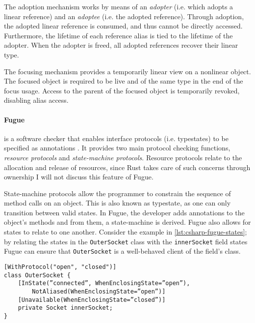 The adoption mechanism works by means of an \emph{adopter} (i.e. which adopts a linear reference) and an \emph{adoptee} (i.e. the adopted reference).
Through adoption, the adopted linear reference is consumed, and thus cannot be directly accessed.
Furthermore, the lifetime of each reference alias is tied to the lifetime of the adopter.
When the adopter is freed, all adopted references recover their linear type.

The focusing mechanism provides a temporarily linear view on a nonlinear object.
The focused object is required to be live and of the same type in the end of the focus usage.
Access to the parent of the focused object is temporarily revoked, disabling alias access.

\paragraph{Fugue} is a software checker that enables interface protocols (i.e. typestates) to be specified as annotations \autocite{DeLine2004}.
It provides two main protocol checking functions, \emph{resource protocols} and \emph{state-machine protocols}.
Resource protocols relate to the allocation and release of resources,
since Rust takes care of such concerns through ownership I will not discuss this feature of Fugue.

State-machine protocols allow the programmer to constrain the sequence of method calls on an object.
This is also known as typestate, as one can only transition between valid states.
In Fugue, the developer adds annotations to the object's methods and from them, a state-machine is derived.
Fugue also allows for states to relate to one another.
Consider the example in \autoref{lst:csharp-fugue-states}; by relating the states in the \texttt{OuterSocket} class
with the \texttt{innerSocket} field states Fugue can ensure that \texttt{OuterSocket} is a well-behaved client of the field's class.

\begin{listing}
    \centering
    \begin{verbatim}
[WithProtocol("open", "closed")]
class OuterSocket {
    [InState(”connected”, WhenEnclosingState=”open”),
        NotAliased(WhenEnclosingState=”open”)]
    [Unavailable(WhenEnclosingState=”closed”)]
    private Socket innerSocket;
}
    \end{verbatim}
    \caption{
        Relating a class's states with the \texttt{innerSocket} states.
        In this example, the \texttt{OuterSocket}'s \texttt{open} state is related with the \texttt{connected} state of the socket.
        This ensures that the \texttt{OuterSocket} is a well-behaved client of \texttt{innerSocket}.
    }
    \label{lst:csharp-fugue-states}
\end{listing}

